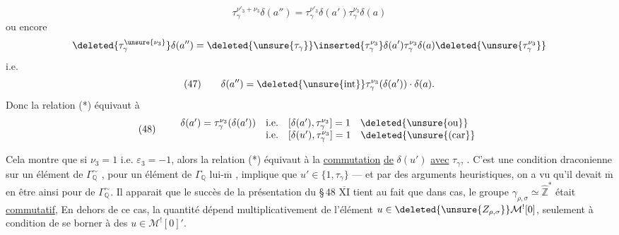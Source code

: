

\[
\tau_\gamma^{\nu'_3+\nu_3}\delta(a'')
 =\tau_\gamma^{\nu'_3}\delta(a')\tau_\gamma^{\nu_3}\delta(a)
\]
ou encore
\[
\deleted{\tau_\gamma^{\unsure{\nu_3}}}\delta(a'')
 =\deleted{\unsure{\tau_\gamma}}\inserted{\tau_\gamma^{\nu_3}}
 \delta(a')\tau_\gamma^{\nu_3}\delta(a)
 \deleted{\unsure{\tau_\gamma^{\nu_3}}}
\]
i.e.
\[
(47)\qquad
\delta(a'')=\deleted{\unsure{\operatorname{int}}}
 \tau_\gamma^{\nu_3}(\delta(a'))\cdot\delta(a).
\]
Donc la relation (*) équivaut à
\[
(48)\qquad
\begin{array}{lll}
\delta(a')=\tau_\gamma^{\nu_3}(\delta(a'))
 &\text{i.e.}&[\delta(a'),\tau_\gamma^{\nu_3}]=1\quad
 \deleted{\unsure{\text{ou}}}\\
 &\text{i.e.}&[\delta(u'),\tau_\gamma^{\nu_3}]=1\quad
 \deleted{\unsure{\text{(car}}}
\end{array}
\]

Cela montre que si \(\nu_3=1\) i.e. \(\varepsilon_3=-1\), alors
la relation (*) équivaut à la \uline{commutation}
\uline{de} \(\delta(u')\) 
\uline{avec} \(\tau_\gamma\),
.
C'est une condition draconienne sur un élément de \(\Gamma_{\mathbb Q}^{\sim}\)
, pour un élément de \(\Gamma_{\mathbb Q}\)
lui-\(\overline{\mathrm m}\) , implique que
\(u'\in\{1,\tau_\gamma\}\) --- et par des arguments heuristiques, on a vu
qu'il devait \(\overline{\mathrm m}\) en être ainsi pour 
de \(\Gamma_{\mathbb Q}^{\sim}\). Il apparait que le succès de la présentation
du \S\,48 \uline{\(\overline{\mathrm{XI}}\)} tient au fait que
 
 dans  cas,
le groupe \(\gamma_{\rho,\sigma}\simeq\widehat{\mathbb Z}^{*}\)
était \uline{commutatif}, 
En dehors de ce cas, la quantité
dépend multiplicativement de l'élément
\(u\in\deleted{\unsure{Z_{\rho,\sigma}}}\mathcal M^{!}[0]\),
seulement à condition de se borner à des \(u\in\mathcal M^{!}[0]'\).

